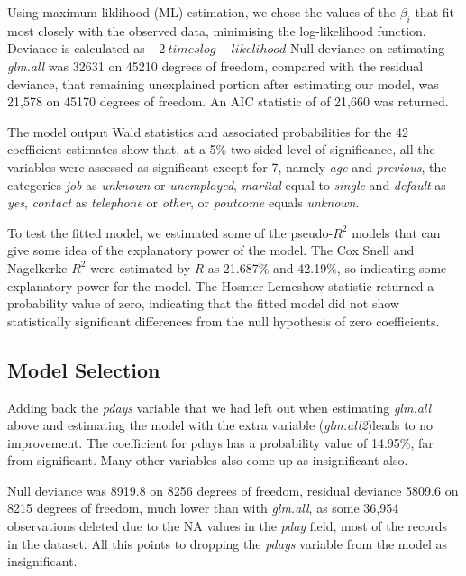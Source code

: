 \documentclass[9pt,technote]{IEEEtran}
\begin{document}
Using maximum liklihood (ML) estimation, we chose the values of the $\beta_i$ that fit most closely with the observed data, minimising the log-likelihood function.  Deviance is calculated as $-2 \ times log-likelihood$
Null deviance on estimating \textit{glm.all} was 32631 on 45210  degrees of freedom, compared with the residual deviance, that remaining unexplained portion after estimating our model, was 21,578 on 45170 degrees of freedom.  An AIC statistic of of 21,660 was returned.  

The model output Wald statistics and associated probabilities for the 42 coefficient estimates show that, at a 5\% two-sided level of significance, all the variables were assessed as significant except for 7, namely \textit{age} and \textit{previous}, the categories \textit{job} as \textit{unknown} or \textit{unemployed}, \textit{marital} equal to \textit{single} and \textit{default} as \textit{yes}, \textit{contact} as \textit{telephone} or \textit{other}, or \textit{poutcome} equals \textit{unknown}. 

To test the fitted model, we estimated some of the pseudo-$R^2$ models that can give some idea of the explanatory power of the model.  The Cox Snell and Nagelkerke $R^2$ were estimated by \textit{R} as 21.687\% and 42.19\%, so indicating some explanatory power for the model.  The Hosmer-Lemeshow statistic returned a probability value of zero, indicating that the fitted model did not show statistically significant differences from the null hypothesis of zero coefficients.   

\subsection{Model Selection}

Adding back the \textit{pdays} variable that we had left out when estimating \textit{glm.all} above and estimating the model with the extra variable (\textit{glm.all2})leads to no improvement.  The coefficient for pdays has a probability value of 14.95\%, far from significant.  Many other variables also come up as insignificant also.  

Null deviance was 8919.8 on 8256  degrees of freedom, residual deviance 5809.6 on 8215 degrees of freedom, much lower than with \textit{glm.all}, as some 36,954 observations deleted due to the NA values in the \textit{pday} field, most of the records in the dataset.  All this points to dropping the \textit{pdays} variable from the model as insignificant.  
\end{document}
